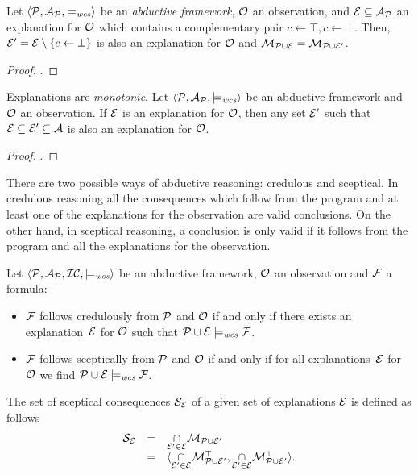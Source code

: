 \bigskip
\begin{prop} 
\label{prop:p0}
\normalfont
Let $\langle \mathcal{P}, \mathcal{A}_{\mathcal{P}}, \models_{\normalfont\textit{wcs}} \rangle$ be an \textit{abductive framework}, $\mathcal{O}$ an observation, and $\mathcal{E} \subseteq \mathcal{A}_{\mathcal{P}}$ an explanation for $\mathcal{O}$ which contains a complementary pair $c \leftarrow \top, c \leftarrow \bot$. Then, $\mathcal{E}'= \mathcal{E} \setminus \{c \leftarrow \bot\}$ is also an explanation for $\mathcal{O}$ and $\mathcal{M}_{\mathcal{P} \cup \mathcal{E}} = \mathcal{M}_{\mathcal{P} \cup \mathcal{E}'}$.
\begin{proof}
 \cite{corepaper}.
\end{proof}
\end{prop}
\bigskip
\begin{prop}
\label{prop:monotonicity}
\normalfont
Explanations are \textit{monotonic}. Let $\langle \mathcal{P}, \mathcal{A}_{\mathcal{P}}, \models_{\normalfont\textit{wcs}} \rangle$ be an abductive framework and $\mathcal{O}$ an observation. If $\mathcal{E}$ is an explanation for $\mathcal{O}$, then any set $\mathcal{E}'$ such that $\mathcal{E} \subseteq \mathcal{E}' \subseteq \mathcal{A}$ is also an explanation for $\mathcal{O}$.
\begin{proof}
\cite{holldobler2009logic}.
\end{proof}
\end{prop}

There are two possible ways of abductive reasoning: credulous and sceptical. In credulous reasoning all the consequences which follow from the program and at least one of the explanations for the observation are valid conclusions. On the other hand, in sceptical reasoning, a conclusion is only valid if it follows from the program and all the explanations for the observation. 

Let $\langle \mathcal{P}, \mathcal{A}_{\mathcal{P}}, {\cal IC}, \models_{\normalfont\textit{wcs}}\rangle$ be an abductive framework, $\mathcal{O}$ an observation and $\mathcal{F}$ a formula:
\begin{itemize}
\item $\mathcal{F}$ follows credulously from $\mathcal{P}$ and $\mathcal{O}$  if and only if there exists an explanation~$\mathcal{E}$ for $\mathcal{O}$ such that $\mathcal{P} \cup \mathcal{E} \models_{\normalfont\textit{wcs}} \mathcal{F}$.
\item $\mathcal{F}$ follows sceptically from $\mathcal{P}$ and $\mathcal{O}$ if and only if for all explanations~$\mathcal{E}$ for $\mathcal{O}$ we find $\mathcal{P} \cup \mathcal{E} \models_{\normalfont\textit{wcs}} \mathcal{F}$.
\end{itemize}

The set of sceptical consequences $\mathcal{S}_{\mathcal{E}}$ of a given set of explanations $\mathcal{E}$ is defined as follows
\[
\begin{array}{lcl}
\mathcal{S}_{\mathcal{E}} & = &  \underset{\mathcal{E}' \in \mathcal{E}}{\cap} \mathcal{M}_{\mathcal{P} \cup \mathcal{E}' } \\
		      & = &  \langle  \underset{\mathcal{E}' \in \mathcal{E}}{\cap} \mathcal{M}_{\mathcal{P} \cup \mathcal{E}' }^\top, \underset{\mathcal{E}' \in \mathcal{E}}{\cap} \mathcal{M}_{\mathcal{P} \cup \mathcal{E}'} ^ \bot \rangle.
\end{array}
\]

